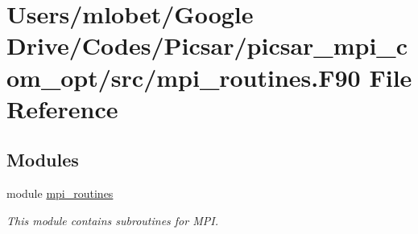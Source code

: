 \hypertarget{mpi__routines_8_f90}{}\section{Users/mlobet/\+Google Drive/\+Codes/\+Picsar/picsar\+\_\+mpi\+\_\+com\+\_\+opt/src/mpi\+\_\+routines.F90 File Reference}
\label{mpi__routines_8_f90}
\subsection*{Modules}
\begin{DoxyCompactItemize}
\item 
module \hyperlink{namespacempi__routines}{mpi\+\_\+routines}
\begin{DoxyCompactList}\small\item\em This module contains subroutines for M\+PI. \end{DoxyCompactList}\end{DoxyCompactItemize}
